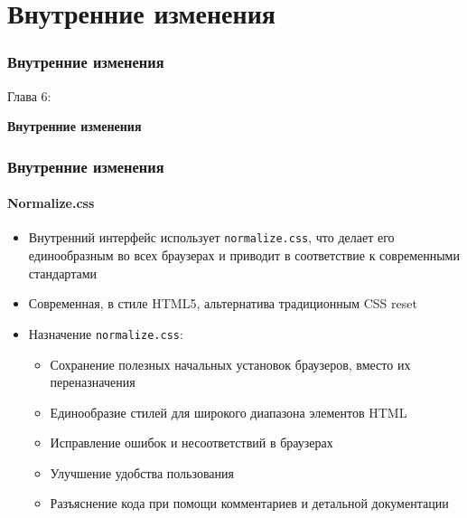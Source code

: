 %

\section{Внутренние изменения}
\begin{frame}[fragile]
	\frametitle{Внутренние изменения}

	\begin{center}\huge{Глава 6:}\end{center}
	\begin{center}\huge{\color{typo3darkgrey}\textbf{Внутренние изменения}}\end{center}

\end{frame}


\begin{frame}[fragile]
	\frametitle{Внутренние изменения}
	\framesubtitle{Normalize.css}

	\begin{itemize}
		\item Внутренний интерфейс использует \texttt{normalize.css},\newline
			что делает его единообразным во всех браузерах и приводит в соответствие к современными стандартами
		\item Современная, в стиле HTML5, альтернатива традиционным CSS reset
		\item Назначение \texttt{normalize.css}:

			\begin{itemize}
				\item Сохранение полезных начальных установок браузеров, вместо их переназначения
				\item Единообразие стилей для широкого диапазона элементов HTML
				\item Исправление ошибок и несоответствий в браузерах
				\item Улучшение удобства пользования
				\item Разъяснение кода при помощи комментариев и детальной документации
			\end{itemize}

	\end{itemize}

\end{frame}

